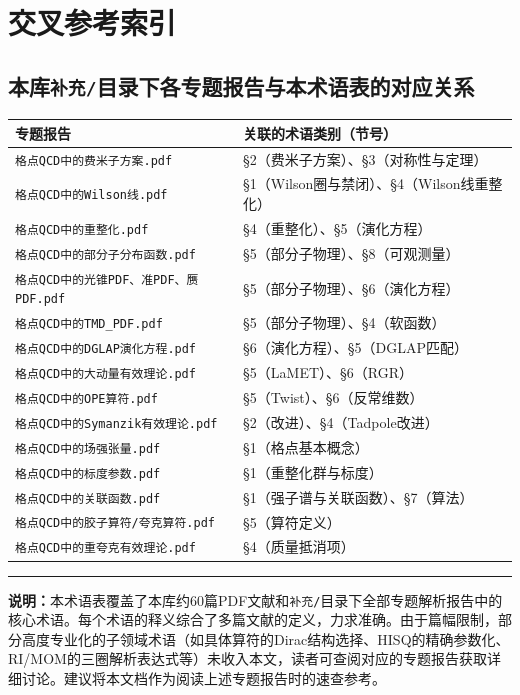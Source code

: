 \documentclass[12pt,a4paper]{ctexart}
\begin{document}
\section{交叉参考索引}

\subsection*{本库\texttt{补充/}目录下各专题报告与本术语表的对应关系}

\begin{table}[H]
\centering
\small
\begin{tabular}{lp{10cm}}
\toprule
\textbf{专题报告} & \textbf{关联的术语类别（节号）} \\
\midrule
\texttt{格点QCD中的费米子方案.pdf} & §2（费米子方案）、§3（对称性与定理） \\
\texttt{格点QCD中的Wilson线.pdf} & §1（Wilson圈与禁闭）、§4（Wilson线重整化） \\
\texttt{格点QCD中的重整化.pdf} & §4（重整化）、§5（演化方程） \\
\texttt{格点QCD中的部分子分布函数.pdf} & §5（部分子物理）、§8（可观测量） \\
\texttt{格点QCD中的光锥PDF、准PDF、赝PDF.pdf} & §5（部分子物理）、§6（演化方程） \\
\texttt{格点QCD中的TMD\_PDF.pdf} & §5（部分子物理）、§4（软函数） \\
\texttt{格点QCD中的DGLAP演化方程.pdf} & §6（演化方程）、§5（DGLAP匹配） \\
\texttt{格点QCD中的大动量有效理论.pdf} & §5（LaMET）、§6（RGR） \\
\texttt{格点QCD中的OPE算符.pdf} & §5（Twist）、§6（反常维数） \\
\texttt{格点QCD中的Symanzik有效理论.pdf} & §2（改进）、§4（Tadpole改进） \\
\texttt{格点QCD中的场强张量.pdf} & §1（格点基本概念） \\
\texttt{格点QCD中的标度参数.pdf} & §1（重整化群与标度） \\
\texttt{格点QCD中的关联函数.pdf} & §1（强子谱与关联函数）、§7（算法） \\
\texttt{格点QCD中的胶子算符/夸克算符.pdf} & §5（算符定义） \\
\texttt{格点QCD中的重夸克有效理论.pdf} & §4（质量抵消项） \\
\bottomrule
\end{tabular}
\end{table}

\vspace{1cm}
\noindent\rule{\textwidth}{0.5pt}
\small
\textbf{说明：}本术语表覆盖了本库约60篇PDF文献和\texttt{补充/}目录下全部专题解析报告中的核心术语。每个术语的释义综合了多篇文献的定义，力求准确。由于篇幅限制，部分高度专业化的子领域术语（如具体算符的Dirac结构选择、HISQ的精确参数化、RI/MOM的三圈解析表达式等）未收入本文，读者可查阅对应的专题报告获取详细讨论。建议将本文档作为阅读上述专题报告时的速查参考。
\end{document}

